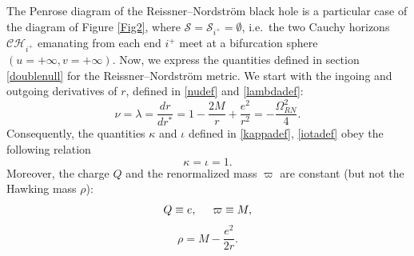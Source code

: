 \documentclass[10pt,a4paper]{article}
\theoremstyle{plain}
\theoremstyle{remark}
\theoremstyle{definition}
\theoremstyle{plain}
\theoremstyle{remark}
\theoremstyle{definition}
\newcommand{\CH}{\mathcal{CH}_{i^+}}
\numberwithin{equation}{section}
\begin{document}
The Penrose diagram of the Reissner--Nordstr\"{o}m black hole is a particular case of the diagram of Figure \ref{Fig2}, where $\mathcal{S}=\mathcal{S}_{i^+}= \emptyset$, i.e.\ the two Cauchy horizons $\CH$ emanating from each end $i^+$ meet at a bifurcation sphere $(u=+\infty,v=+\infty)$.
Now, we express the quantities defined in section \ref{doublenull} for the Reissner--Nordstr\"{o}m metric. We start with the ingoing and outgoing derivatives of $r$, defined in \eqref{nudef} and \eqref{lambdadef}:
$$ \nu = \lambda = \frac{dr}{dr^*}= 1-\frac{2M}{r} +\frac{e^2}{r^2} = -\frac{\Omega^2_{RN}}{4}.$$
Consequently, the quantities $\kappa$ and $\iota$ defined in \eqref{kappadef}, \eqref{iotadef} obey the following relation $$\kappa = \iota = 1.$$
Moreover, the charge $Q$ and the renormalized mass $\varpi$ are constant (but not the Hawking mass $\rho$): $$ Q \equiv e, \hskip 5 mm \varpi \equiv M,$$ $$ \rho = M -\frac{e^2}{2r}.$$
\end{document}
